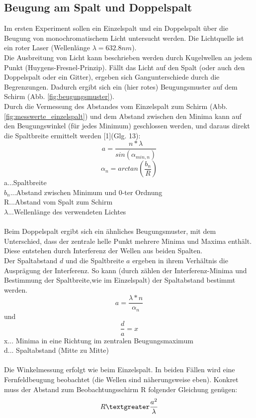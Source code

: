 \documentclass[12pt,a4paper]{article}
\begin{document}
\begin{multicols}{2}

\section{Beugung am Spalt und Doppelspalt}
Im ersten Experiment sollen ein Einzelspalt und ein Doppelspalt über die Beugung von monochromatischem Licht untersucht werden. Die Lichtquelle ist ein roter Laser (Wellenlänge $\lambda = 632.8nm$). \\
Die Ausbreitung von Licht kann beschrieben werden durch Kugelwellen an jedem Punkt (Huygens-Fresnel-Prinzip). Fällt das Licht auf den Spalt (oder auch den Doppelspalt oder ein Gitter), ergeben sich Gangunterschiede durch die Begrenzungen. Dadurch ergibt sich ein (hier rotes) Beugungsmuster auf dem Schirm (Abb. \ref{fig:beugungsmuster}). 
\\
Durch die Vermessung des Abstandes vom Einzelspalt zum Schirm (Abb. \ref{fig:messwerte_einzelspalt}) und dem Abstand zwischen den Minima kann auf den Beugungswinkel (für jedes Minimum) geschlossen werden, und daraus direkt die Spaltbreite ermittelt werden [1](Glg. 13):
$$a = \frac{n*\lambda}{sin(\alpha_{min,n})} $$
$$\alpha_n = arctan(\frac{b_n}{R})$$
a...Spaltbreite\\
$b_n$...Abstand zwischen Minimum und 0-ter Ordnung\\
R...Abstand vom Spalt zum Schirm\\
$\lambda$...Wellenlänge des verwendeten Lichtes\\
\\
Beim Doppelspalt ergibt sich ein ähnliches Beugungsmuster, mit dem Unterschied, dass der zentrale helle Punkt mehrere Minima und Maxima enthält. Diese entstehen durch Interferenz der Wellen aus beiden Spalten.\\
Der Spaltabstand $d$ und die Spaltbreite $a$ ergeben in ihrem Verhältnis die Ausprägung der Interferenz. So kann (durch zählen der Interferenz-Minima und Bestimmung der Spaltbreite,wie im Einzelspalt) der Spaltabstand bestimmt werden.
$$ a = \frac{\lambda * n}{\alpha_n} $$
und
$$\frac{d}{a} = x$$
\noindent
x... Minima in eine Richtung im zentralen Beugungsmaximum\\
d... Spaltabstand (Mitte zu Mitte)\\
\\
Die Winkelmessung erfolgt wie beim Einzelspalt.
In beiden Fällen wird eine Fernfeldbeugung beobachtet (die Wellen sind näherungsweise eben). Konkret muss der Abstand zum Beobachtungsschirm R folgender Gleichung genügen:
$$R \textgreater \frac{a^2}{\lambda}$$
\\
%


\end{multicols}
\end{document}
